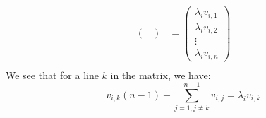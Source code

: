 \documentclass[11pt, legalpaper]{article}
\begin{document}
\begin{enumerate}
\begin{align*}
\begin{pmatrix}
                \end{pmatrix} & =\begin{pmatrix}
                    \lambda_i v_{i,1} \\\lambda_i  v_{i,2} \\ \vdots \\ \lambda_i v_{i,n}
                \end{pmatrix} \\
            \end{align*}
            We see that for a line $k$ in the matrix, we have:
            $$v_{i,k}(n-1)-\sum_{j=1, j\ne k}^{n-1}v_{i,j}=\lambda_i v_{i,k}$$
\end{enumerate}
\end{document}
